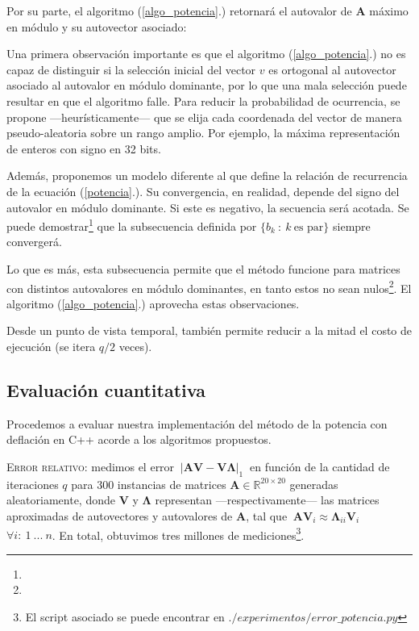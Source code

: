 \vspace{2em}
\noindent Por su parte, el algoritmo (\ref{algo_potencia}.) retornará el autovalor de \textbf{A} máximo en módulo y su autovector asociado:

\vspace{1em}


\vspace{1em}
Una primera observación importante es que el algoritmo (\ref{algo_potencia}.) no es capaz de distinguir si la selección inicial del vector $v$ es ortogonal al autovector asociado al autovalor en módulo dominante, por lo que una mala selección puede resultar en que el algoritmo falle. Para reducir la probabilidad de ocurrencia, se propone ---heurísticamente--- que se elija cada coordenada del vector de manera pseudo-aleatoria sobre un rango amplio. Por ejemplo, la máxima representación de enteros con signo en 32 bits.

\vspace{1em}
Además, proponemos un modelo diferente al que define la relación de recurrencia de la ecuación (\ref{potencia}.). Su convergencia, en realidad, depende del signo del autovalor en módulo dominante. Si este es negativo, la secuencia será acotada. Se puede demostrar\footnote{} que la subsecuencia definida por $\{b_k\ :\ k\ \text{es par}\}$ siempre convergerá. 

Lo que es más, esta subsecuencia permite que el método funcione para matrices con distintos autovalores en módulo dominantes, en tanto estos no sean nulos\footnote{}. El algoritmo (\ref{algo_potencia}.) aprovecha estas observaciones. 

Desde un punto de vista temporal, también permite reducir a la mitad el costo de ejecución (se itera $q / 2$ veces).  





\vspace{2em}
\subsection{Evaluación cuantitativa} Procedemos a evaluar nuestra implementación del método de la potencia con deflación en C++ acorde a los algoritmos propuestos.

\vspace{2em}
\noindent \textsc{Error relativo}: medimos el error $\ |\mathbf{A} \mathbf{V} - \mathbf{V} \mathbf{\Lambda}|_1\ $ en función de la cantidad de iteraciones $q$ para 300 instancias de matrices $\mathbf{A} \in \mathbb{R}^{20 \times 20}$ generadas aleatoriamente, donde \textbf{V} y $\mathbf{\Lambda}$ representan ---respectivamente--- las matrices aproximadas de autovectores y autovalores de \textbf{A}, tal que $\ \mathbf{A}\mathbf{V}_i \approx \mathbf{\Lambda}_{ii} \mathbf{V}_i$\ \ \ $\forall i:\ 1\ ...\ n$.  En total, obtuvimos tres millones de mediciones\footnote{El script asociado se puede encontrar en $./experimentos/error\_potencia.py$}.  


